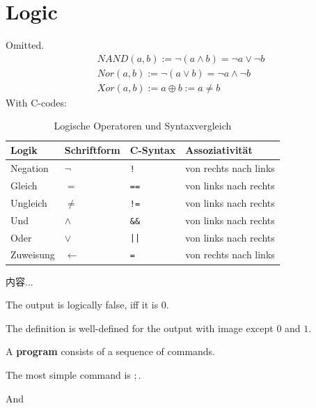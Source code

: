 \documentclass[Total.tex]{subfiles}
\begin{document}
		\section{Logic}
			Omitted.
			\begin{gather*}
				NAND(a,b):=\neg(a\wedge b)=\neg a\vee \neg b\\
				Nor(a,b):=\neg(a\vee b)=\neg a\wedge \neg b\\
				Xor(a,b):=a\oplus b:=a\not=b
			\end{gather*}
			With C-codes:
			\begin{table}[h]
				\centering
				\caption{Logische Operatoren und Syntaxvergleich}
				\vspace{2mm}
				\begin{tabular}{@{}llll@{}}
					\toprule
					\textbf{Logik} & \textbf{Schriftform} & \textbf{C-Syntax} & \textbf{Assoziativität} \\ \midrule
					Negation       & $\neg$               & \texttt{!}        & von rechts nach links   \\
					Gleich         & $=$                  & \texttt{==}       & von links nach rechts   \\
					Ungleich       & $\neq$               & \texttt{!=}       & von links nach rechts   \\
					Und            & $\wedge$             & \texttt{\&\&}     & von links nach rechts   \\
					Oder           & $\vee$               & \texttt{||}       & von links nach rechts   \\
					Zuweisung      & $\leftarrow$         & \texttt{=}        & von rechts nach links   \\ \bottomrule
				\end{tabular}
			\end{table}
			\begin{Def}
				内容...
			\end{Def}
			
			\begin{Def}
				The output is logically false, iff it is $0$.
				
				The definition is well-defined for the output with image except $0$ and $1$.
			\end{Def}
			
			\begin{Def}
				A \textbf{program} consists of a sequence of commands.
				
				The most simple command is $;$.
				
				And 
			\end{Def}
\end{document}
